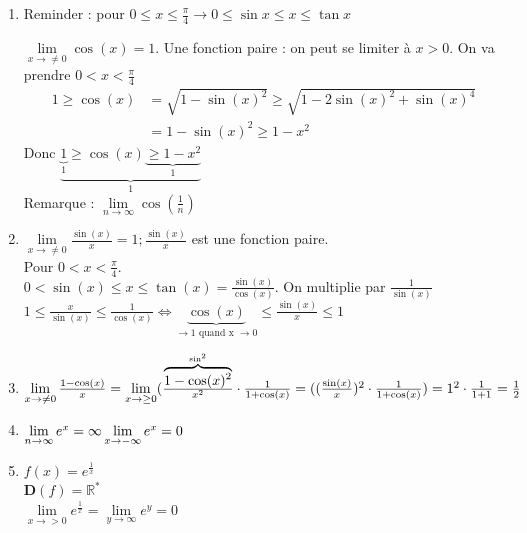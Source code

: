\documentclass[12pt,a4paper]{article}
\newcommand{\limite}{\lim\limits_}
\newcommand{\ninf}{\ensuremath{n \to \infty}}
\newcommand{\R}{\ensuremath{\mathbb{R}} }
\begin{document}
{\begin{enumerate}
\item \begin{boite}
Reminder : pour $0 \leq x \leq \frac{\pi}{4} \to 0 \leq \sin x \leq x \leq \tan x$
\end{boite}
$\limite{x \to \neq 0} \cos(x) = 1$. Une fonction paire : on peut se limiter à $x > 0$. On va prendre $0 < x < \frac{\pi}{4}$\\
\begin{align*}
1 \geq \cos(x) &= \sqrt{1-\sin(x)^2} \geq \sqrt{1-2\sin(x)^2 + \sin(x)^4}\\
&= 1 - \sin(x)^2 \geq 1-x^2
\end{align*}
Donc $\underbrace{\underbrace{1}_{1} \geq \cos(x) \underbrace{\geq 1-x^2}_{1}}_{1}$\\
Remarque : $\limite{\ninf} \cos(\frac{1}{n})$

\item $\limite{x \to \neq 0} \frac{\sin(x)}{x} = 1; \frac{\sin(x)}{x}$ est une fonction paire.\\
Pour $0 < x < \frac{\pi}{4}$.\\
$0 < \sin(x) \leq x \leq \tan(x) = \frac{\sin(x)}{\cos(x)}$. On multiplie par $\frac{1}{\sin(x)}$\\
$1 \leq \frac{x}{\sin(x)} \leq \frac{1}{\cos(x)} \Leftrightarrow \underbrace{\cos(x)}_{\to 1\mbox{ 
quand x } \to 0} \leq\frac{\sin(x)}{x} \leq 1$

\item $\limite{x \to \neq 0} \frac{1-\cos(x)}{x} = \limite{x \to \geq 0} (\frac{\overbrace{1-\cos(x)^2}^{\sin^2}}{x^2}\cdot \frac{1}{1+\cos(x)} = ((\frac{\sin(x)}{x})^2 \cdot \frac{1}{1+\cos(x)})\\
= 1^2 \cdot \frac{1}{1+1} = \frac{1}{2}$

\item $\limite{\ninf} e^x = \infty\\
\limite{x \to -\infty} e^x = 0$

\item $f(x) = e^{\frac{1}{x}}$\\
$\mathbf{D}(f) = \R^*$\\
$\limite{x \to > 0} e^{\frac{1}{x}} = \limite{y \to \infty}e^y = 0$
\end{enumerate}

}
\end{document}
